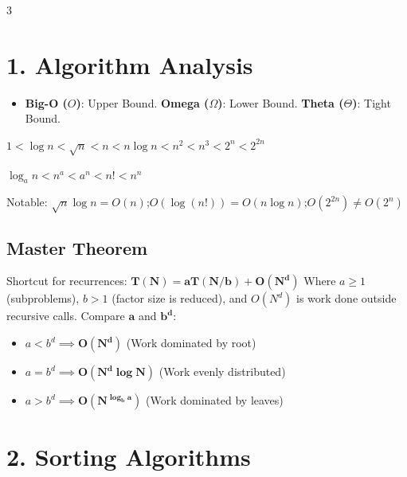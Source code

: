 \documentclass[7pt,landscape]{extarticle}
\begin{document}
\begin{multicols*}{3}

\section*{1. Algorithm Analysis}
\begin{itemize}
    \item \textbf{Big-O ($O$)}: Upper Bound. \textbf{Omega ($\Omega$)}: Lower Bound. \textbf{Theta ($\Theta$)}: Tight Bound.
\end{itemize}

$1 < \log n < \sqrt{n} < n < n\log n < n^2 < n^3 < 2^n < 2^{2n}$

$\log_a n < n^a < a^n < n! < n^n$

\noindent Notable: $\sqrt{n}\log n = O(n)$;\quad $O(\log(n!)) = O(n\log n)$;\quad $O(2^{2n}) \neq O(2^n)$

\subsection*{Master Theorem}
Shortcut for recurrences: $\mathbf{T(N) = aT(N/b) + O(N^d)}$
Where $a \ge 1$ (subproblems), $b > 1$ (factor size is reduced), and $O(N^d)$ is work done outside recursive calls. Compare $\mathbf{a}$ and $\mathbf{b^d}$:
\begin{itemize}
    \item $a < b^d \implies \mathbf{O(N^d)}$ (Work dominated by root)
    \item $a = b^d \implies \mathbf{O(N^d \log N)}$ (Work evenly distributed)
    \item $a > b^d \implies \mathbf{O(N^{\log_b a})}$ (Work dominated by leaves)
\end{itemize}

\section*{2. Sorting Algorithms}


\end{multicols*}
\end{document}
